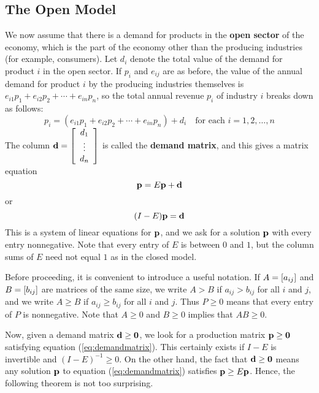 \subsection*{The Open Model}

We now assume that there is a demand for products in the \textbf{open sector} of the economy, which is the part of the economy other than the producing industries (for example, consumers). Let $d_{i}$ denote the total value of the demand for product $i$ in the open sector. If $p_{i}$ and $e_{ij}$ are as before, the value of the annual demand for product $i$ by the producing industries themselves is $e_{i1}p_{1} + e_{i2}p_{2} + \cdots + e_{in}p_{n}$, so the total annual revenue $p_{i}$ of industry $i$ breaks down as follows:
\begin{equation*}
p_{i} = (e_{i1}p_{1} + e_{i2}p_{2} + \cdots + e_{in}p_{n}) + d_{i} \quad \mbox{for each } i = 1, 2, \dots, n
\end{equation*}
The column $\textbf{d} = \left[ \begin{array}{c}
d_{1} \\
\vdots \\
d_{n}
\end{array} \right]$
 is called the \textbf{demand matrix}, and this gives a matrix equation
\begin{equation*}
\textbf{p} = E\textbf{p} + \textbf{d}
\end{equation*}
or
\begin{equation}\label{eq:demandmatrix}
(I - E)\textbf{p} = \textbf{d}
\end{equation}
This is a system of linear equations for $\textbf{p}$, and we ask for a solution $\textbf{p}$ with every entry nonnegative. Note that every entry of $E$ is between $0$ and $1$, but the column sums of $E$ need not equal $1$ as in the closed model.

Before proceeding, it is convenient to introduce a useful notation. If $A = \left[ a_{ij} \right]$ and $B = \left[ b_{ij} \right]$ are matrices of the same size, we write $A > B$ if $a_{ij} > b_{ij}$ for all $i$ and $j$, and we write $A \geq B$ if $a_{ij} \geq b_{ij}$ for all $i$ and $j$. Thus $P \geq 0$ means that every entry of $P$ is nonnegative. Note that $A \geq 0$ and $B \geq 0$ implies that $AB \geq 0$.

Now, given a demand matrix $\textbf{d} \geq \textbf{0}$, we look for a production matrix $\textbf{p} \geq \textbf{0}$ satisfying equation (\ref{eq:demandmatrix}). This certainly exists if $I - E$ is invertible and $(I - E)^{-1} \geq 0$. On the other hand, the fact that $\textbf{d} \geq \textbf{0}$ means any solution $\textbf{p}$ to equation (\ref{eq:demandmatrix}) satisfies $\textbf{p} \geq E\textbf{p}$. Hence, the following theorem is not too surprising.

